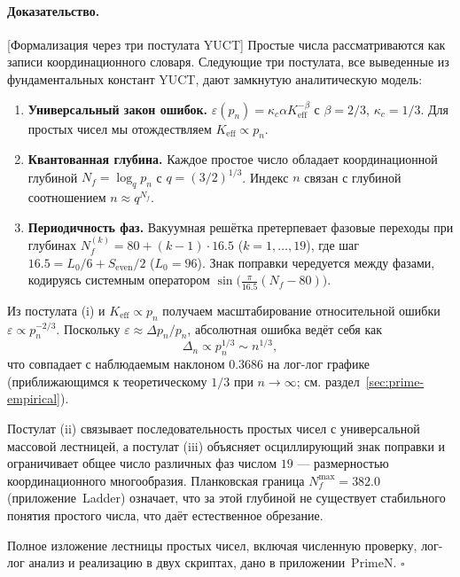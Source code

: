 \documentclass[12pt,a4paper]{article}
\theoremstyle{remark}
\renewenvironment{proof}{\paragraph{Доказательство.}}{\hfill$\square$}
\begin{document}
	\begin{proof}[Формализация через три постулата YUCT]
		Простые числа рассматриваются как записи координационного словаря. Следующие три постулата, все выведенные из фундаментальных констант YUCT, дают замкнутую аналитическую модель:
		\begin{enumerate}[label=(\roman*)]
			\item \textbf{Универсальный закон ошибок.} \(\varepsilon(p_n) = \kappa_c \alpha K_{\mathrm{eff}}^{-\beta}\) с \(\beta = 2/3\), \(\kappa_c = 1/3\). Для простых чисел мы отождествляем \(K_{\mathrm{eff}} \propto p_n\).
			\item \textbf{Квантованная глубина.} Каждое простое число обладает координационной глубиной \(N_f = \log_q p_n\) с \(q = (3/2)^{1/3}\). Индекс \(n\) связан с глубиной соотношением \(n \approx q^{N_f}\).
			\item \textbf{Периодичность фаз.} Вакуумная решётка претерпевает фазовые переходы при глубинах \(N_f^{(k)} = 80 + (k-1)\cdot 16.5\) (\(k=1,\dots,19\)), где шаг \(16.5 = L_0/6 + S_{\mathrm{even}}/2\) (\(L_0=96\)). Знак поправки чередуется между фазами, кодируясь системным оператором \(\sin\bigl(\frac{\pi}{16.5}(N_f-80)\bigr)\).
		\end{enumerate}
		
		Из постулата (i) и \(K_{\mathrm{eff}} \propto p_n\) получаем масштабирование относительной ошибки \(\varepsilon \propto p_n^{-2/3}\). Поскольку \(\varepsilon \approx \Delta p_n / p_n\), абсолютная ошибка ведёт себя как
		\[
		\Delta_n \propto p_n^{1/3} \sim n^{1/3},
		\]
		что совпадает с наблюдаемым наклоном \(0.3686\) на лог-лог графике (приближающимся к теоретическому \(1/3\) при \(n\to\infty\); см. раздел~\ref{sec:prime-empirical}).
		
		Постулат (ii) связывает последовательность простых чисел с универсальной массовой лестницей, а постулат (iii) объясняет осциллирующий знак поправки и ограничивает общее число различных фаз числом \(19\) --- размерностью координационного многообразия. Планковская граница \(N_f^{\max} = 382.0\) (приложение~Ladder) означает, что за этой глубиной не существует стабильного понятия простого числа, что даёт естественное обрезание.
		
		Полное изложение лестницы простых чисел, включая численную проверку, лог-лог анализ и реализацию в двух скриптах, дано в приложении~PrimeN.
	\end{proof}
	
\end{document}
